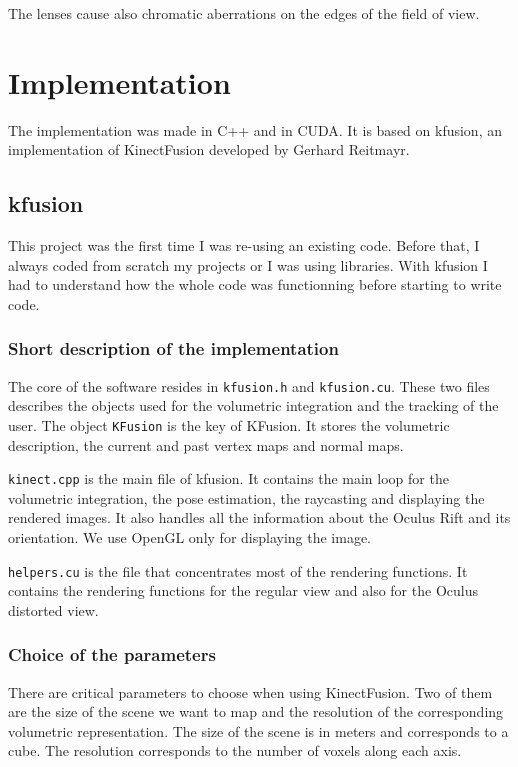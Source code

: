 \documentclass[12pt, twoside]{article}
\let\oldsection\section
\def\section{\cleardoublepage\oldsection}
\begin{document}
The lenses cause also chromatic aberrations on the edges of the field of view.

\newpage
\section{Implementation}
The implementation was made in C++ and in CUDA. It is based on kfusion, an implementation of KinectFusion developed by Gerhard Reitmayr.

\subsection{kfusion}
This project was the first time I was re-using an existing code. Before that, I always coded from scratch my projects or I was using libraries. With kfusion I had to understand how the whole code was functionning before starting to write code.

\subsubsection{Short description of the implementation}
The core of the software resides in \texttt{kfusion.h} and \texttt{kfusion.cu}. These two files describes the objects used for the volumetric integration and the tracking of the user. The object \texttt{KFusion} is the key of KFusion. It stores the volumetric description, the current and past vertex maps and normal maps.

\texttt{kinect.cpp} is the main file of kfusion. It contains the main loop for the volumetric integration, the pose estimation, the raycasting and displaying the rendered images. It also handles all the information about the Oculus Rift and its orientation. We use OpenGL only for displaying the image.

\texttt{helpers.cu} is the file that concentrates most of the rendering functions. It contains the rendering functions for the regular view and also for the Oculus distorted view.

\subsubsection{Choice of the parameters}
There are critical parameters to choose when using KinectFusion. Two of them are the size of the scene we want to map and the resolution of the corresponding volumetric representation. The size of the scene is in meters and corresponds to a cube. The resolution corresponds to the number of voxels along each axis.
\end{document}
